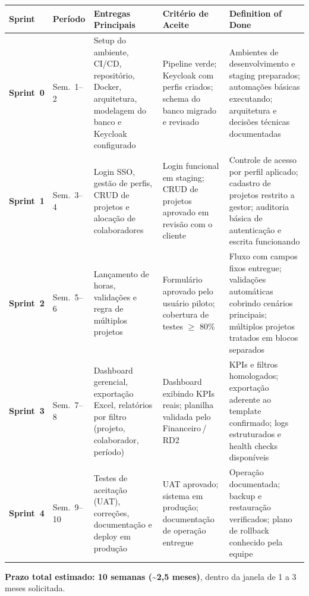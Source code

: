 \documentclass[12pt,a4paper]{article}
\begin{document}
\begin{tabularx}{\linewidth}{>{\bfseries}l l >{\raggedright\arraybackslash}X >{\raggedright\arraybackslash}X >{\raggedright\arraybackslash}X}
  \toprule
  \textbf{Sprint} & \textbf{Per\'iodo} & \textbf{Entregas Principais} & \textbf{Crit\'erio de Aceite} & \textbf{Definition of Done} \\
  \midrule
  Sprint~0 & Sem.~1--2 &
    Setup do ambiente, CI/CD, reposit\'orio, Docker, arquitetura, modelagem do banco e
    Keycloak configurado &
    Pipeline verde; Keycloak com perfis criados; schema do banco migrado e revisado &
    Ambientes de desenvolvimento e staging preparados; automações básicas executando; arquitetura e decisões técnicas documentadas \\[6pt]
  Sprint~1 & Sem.~3--4 &
    Login SSO, gest\~ao de perfis, CRUD de projetos e aloca\c{c}\~ao de colaboradores &
    Login funcional em staging; CRUD de projetos aprovado em revis\~ao com o cliente &
    Controle de acesso por perfil aplicado; cadastro de projetos restrito a gestor; auditoria básica de autenticação e escrita funcionando \\[6pt]
  Sprint~2 & Sem.~5--6 &
    Lan\c{c}amento de horas, valida\c{c}\~oes e regra de m\'ultiplos projetos &
    Formul\'ario aprovado pelo usu\'ario piloto; cobertura de testes $\geq$ 80\% &
    Fluxo com campos fixos entregue; validações automáticas cobrindo cenários principais; múltiplos projetos tratados em blocos separados \\[6pt]
  Sprint~3 & Sem.~7--8 &
    Dashboard gerencial, exporta\c{c}\~ao Excel, relat\'orios por filtro
    (projeto, colaborador, per\'iodo) &
    Dashboard exibindo KPIs reais; planilha validada pelo Financeiro\,/\,RD2 &
    KPIs e filtros homologados; exportação aderente ao template confirmado; logs estruturados e health checks disponíveis \\[6pt]
  Sprint~4 & Sem.~9--10 &
    Testes de aceita\c{c}\~ao (UAT), corre\c{c}\~oes, documenta\c{c}\~ao e
    deploy em produ\c{c}\~ao &
    UAT aprovado; sistema em produ\c{c}\~ao; documenta\c{c}\~ao de opera\c{c}\~ao entregue &
    Operação documentada; backup e restauração verificados; plano de rollback conhecido pela equipe \\
  \bottomrule
\end{tabularx}

\textbf{Prazo total estimado: 10 semanas (\textasciitilde{}2,5 meses)}, dentro da janela de 1 a 3 meses
solicitada.

\end{document}
